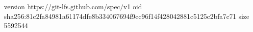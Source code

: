 version https://git-lfs.github.com/spec/v1
oid sha256:81c2fa84981a61174dfe8b334067694f9cc96f14f428042881c5125c2bfa7c71
size 5592544
